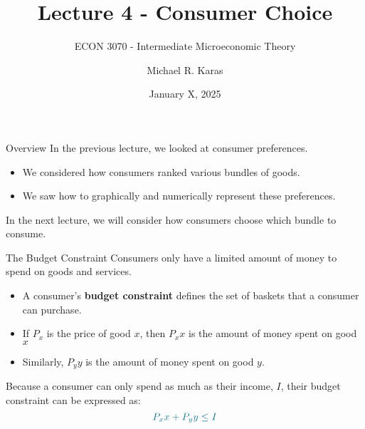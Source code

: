 \documentclass[12pt,t]{beamer}
\author{Michael R. Karas}
\title{Lecture 4 - Consumer Choice}
\subtitle{ECON 3070 - Intermediate Microeconomic Theory}
\date{January X, 2025}
\begin{document}
\begin{frame}
  \titlepage
\end{frame}

\begin{frame}{Overview}
  In the previous lecture, we looked at consumer preferences.
  \begin{itemize}
    \item We considered how consumers ranked various bundles of goods.

    \item We saw how to graphically and numerically represent these preferences.
  \end{itemize}

  \bigskip
  In the next lecture, we will consider how consumers choose which bundle to consume.
\end{frame}

\begin{frame}{The Budget Constraint}
  Consumers only have a limited amount of money to spend on goods and services.
  \begin{itemize}
    \item A consumer's \textbf{budget constraint} defines the set of baskets that a consumer can purchase.
    
    \pause
    \item If $P_x$ is the price of good $x$, then $P_x x$ is the amount of money spent on good $x$
    
    \item Similarly, $P_y y$ is the amount of money spent on good $y$.
  \end{itemize}
  
  \pause\bigskip
  Because a consumer can only spend as much as their income, $I$, their budget constraint can be expressed as:
  $$
    \alice{P_x x + P_y y \leq I}
  $$
\end{frame}
\end{document}
